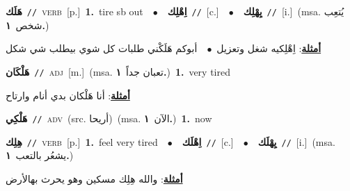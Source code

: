 \documentclass[10pt,a4paper,twoside]{article} %
\begin{document}
\begin{multicols}{2}
{\setlength\topsep{0pt}\textbf{\foreignlanguage{arabic}{هَلَك}}\ {\color{gray}\texttt{//}\color{black}}\ \textsc{verb}\ [p.]\ \textbf{1.}~tire sb out\ \ $\bullet$\ \ \setlength\topsep{0pt}\textbf{\foreignlanguage{arabic}{اِهْلِك}}\ {\color{gray}\texttt{//}\color{black}}\ [c.]\ \ $\bullet$\ \ \setlength\topsep{0pt}\textbf{\foreignlanguage{arabic}{يِهْلِك}}\ {\color{gray}\texttt{//}\color{black}}\ [i.]\ \color{gray}(msa. \foreignlanguage{arabic}{يُتعِب شخص}~\foreignlanguage{arabic}{\textbf{١.}})\color{black}\  \begin{flushright}\color{gray}\foreignlanguage{arabic}{\textbf{\underline{\foreignlanguage{arabic}{أمثلة}}}: اِهْلِكيه شغل وتعزيل\ $\bullet$\ \  أبوكم هَلَكْني طلبات كل شوي بيطلب شي شكل}\end{flushright}\color{black}} \vspace{2mm}

{\setlength\topsep{0pt}\textbf{\foreignlanguage{arabic}{هَلْكَان}}\ {\color{gray}\texttt{//}\color{black}}\ \textsc{adj}\ [m.]\ \color{gray}(msa. \foreignlanguage{arabic}{تعبان جداً}~\foreignlanguage{arabic}{\textbf{١.}})\color{black}\ \textbf{1.}~very tired\  \begin{flushright}\color{gray}\foreignlanguage{arabic}{\textbf{\underline{\foreignlanguage{arabic}{أمثلة}}}: أنا هَلْكان بدي أنام وارتاح}\end{flushright}\color{black}} \vspace{2mm}

{\setlength\topsep{0pt}\textbf{\foreignlanguage{arabic}{هَلْكِي}}\ {\color{gray}\texttt{//}\color{black}}\ \textsc{adv}\ (src. \color{gray}\foreignlanguage{arabic}{أريحا}\color{black})\ \color{gray}(msa. \foreignlanguage{arabic}{الآن}~\foreignlanguage{arabic}{\textbf{١.}})\color{black}\ \textbf{1.}~now\ } \vspace{2mm}

{\setlength\topsep{0pt}\textbf{\foreignlanguage{arabic}{هِلِك}}\ {\color{gray}\texttt{//}\color{black}}\ \textsc{verb}\ [p.]\ \textbf{1.}~feel very tired\ \ $\bullet$\ \ \setlength\topsep{0pt}\textbf{\foreignlanguage{arabic}{اِهْلَك}}\ {\color{gray}\texttt{//}\color{black}}\ [c.]\ \ $\bullet$\ \ \setlength\topsep{0pt}\textbf{\foreignlanguage{arabic}{يِهْلَك}}\ {\color{gray}\texttt{//}\color{black}}\ [i.]\ \color{gray}(msa. \foreignlanguage{arabic}{يشعُر بالتعب}~\foreignlanguage{arabic}{\textbf{١.}})\color{black}\  \begin{flushright}\color{gray}\foreignlanguage{arabic}{\textbf{\underline{\foreignlanguage{arabic}{أمثلة}}}: والله هِلِك مسكين وهو يحرث بهالأرض}\end{flushright}\color{black}} \vspace{2mm}


\end{multicols}
\end{document}
